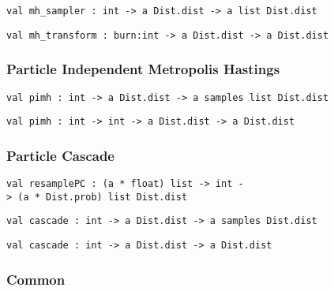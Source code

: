 \protect\hyperlink{val-mhux5fsampler}{}\texttt{val\ mh\_sampler\ :\ int\ -\textgreater{}\ \textquotesingle{}a\ Dist.dist\ -\textgreater{}\ \textquotesingle{}a\ list\ Dist.dist}

\protect\hyperlink{val-mhux5ftransform}{}\texttt{val\ mh\_transform\ :\ burn:int\ -\textgreater{}\ \textquotesingle{}a\ Dist.dist\ -\textgreater{}\ \textquotesingle{}a\ Dist.dist}

\hypertarget{infux5fpmcmc}{\subsubsection{\texorpdfstring{\protect\hyperlink{infux5fpmcmc}{}Particle
Independent Metropolis
Hastings}{Particle Independent Metropolis Hastings}}\label{infux5fpmcmc}}

\protect\hyperlink{val-pimh}{}\texttt{val\ pimh\ :\ int\ -\textgreater{}\ \textquotesingle{}a\ Dist.dist\ -\textgreater{}\ \textquotesingle{}a\ samples\ list\ Dist.dist}

\protect\hyperlink{val-pimhux27}{}\texttt{val\ pimh\textquotesingle{}\ :\ int\ -\textgreater{}\ int\ -\textgreater{}\ \textquotesingle{}a\ Dist.dist\ -\textgreater{}\ \textquotesingle{}a\ Dist.dist}

\hypertarget{infux5fpc}{\subsubsection{\texorpdfstring{\protect\hyperlink{infux5fpc}{}Particle
Cascade}{Particle Cascade}}\label{infux5fpc}}

\protect\hyperlink{val-resamplePC}{}\texttt{val\ resamplePC\ :\ (\textquotesingle{}a\ *\ float)\ list\ -\textgreater{}\ int\ -\textgreater{}\ (\textquotesingle{}a\ *\ Dist.prob)\ list\ Dist.dist}

\protect\hyperlink{val-cascade}{}\texttt{val\ cascade\ :\ int\ -\textgreater{}\ \textquotesingle{}a\ Dist.dist\ -\textgreater{}\ \textquotesingle{}a\ samples\ Dist.dist}

\protect\hyperlink{val-cascadeux27}{}\texttt{val\ cascade\textquotesingle{}\ :\ int\ -\textgreater{}\ \textquotesingle{}a\ Dist.dist\ -\textgreater{}\ \textquotesingle{}a\ Dist.dist}

\hypertarget{com}{\subsubsection{\texorpdfstring{\protect\hyperlink{com}{}Common}{Common}}\label{com}}

